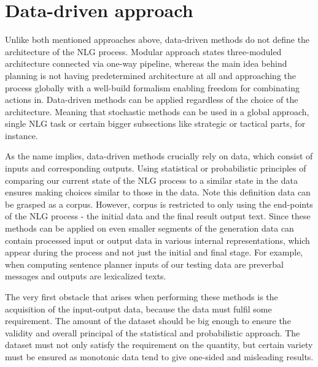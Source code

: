 \section{Data-driven approach}
Unlike both mentioned approaches above, data-driven methods do not define the architecture of the NLG process. Modular approach states three-moduled architecture connected via one-way pipeline, whereas the main idea behind planning is not having predetermined architecture at all and approaching the process globally with a well-build formalism enabling freedom for combinating actions in. Data-driven methods can be applied regardless of the choice of the architecture. Meaning that stochastic methods can be used in a global approach, single NLG task or certain bigger subsections like strategic or tactical parts, for instance.

As the name implies, data-driven methods crucially rely on data, which consist of inputs and corresponding outputs. Using statistical or probabilistic principles of comparing our current state of the NLG process to a similar state in the data ensures making choices similar to those in the data. Note this definition data can be grasped as a corpus. However, corpus is restricted to only using the end-points of the NLG process - the initial data and the final result output text. Since these methods can be applied on even smaller segments of the generation data can contain processed input or output data in various internal representations, which appear during the process and not just the initial and final stage. For example, when computing sentence planner inputs of our testing data are preverbal messages and outputs are lexicalized texts.

The very first obstacle that arises when performing these methods is the acquisition of the input-output data, because the data must fulfil some requirement. The amount of the dataset should be big enough to ensure the validity and overall principal of the statistical and probabilistic approach. The dataset must not only satisfy the requirement on the quantity, but certain variety must be ensured as monotonic data tend to give one-sided and misleading results. 

